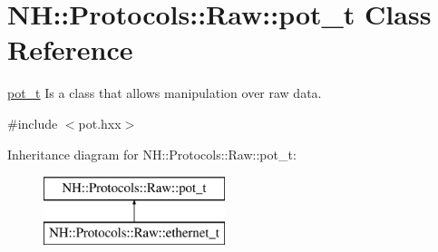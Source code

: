 \hypertarget{class_n_h_1_1_protocols_1_1_raw_1_1pot__t}{\section{N\+H\+:\+:Protocols\+:\+:Raw\+:\+:pot\+\_\+t Class Reference}
\label{class_n_h_1_1_protocols_1_1_raw_1_1pot__t}
}


\hyperlink{class_n_h_1_1_protocols_1_1_raw_1_1pot__t}{pot\+\_\+t} Is a class that allows manipulation over raw data.  




{\ttfamily \#include $<$pot.\+hxx$>$}

Inheritance diagram for N\+H\+:\+:Protocols\+:\+:Raw\+:\+:pot\+\_\+t\+:\begin{figure}[H]
\begin{center}
\leavevmode
\includegraphics[height=2.000000cm]{class_n_h_1_1_protocols_1_1_raw_1_1pot__t}
\end{center}
\end{figure}
